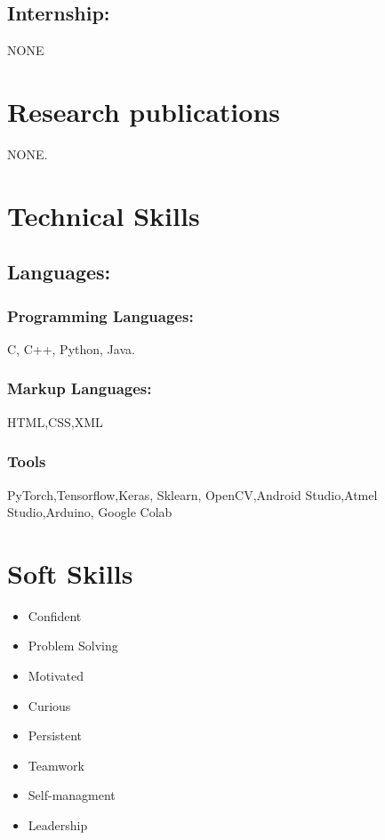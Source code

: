 \documentclass[5pt]{article}
\begin{document}
\subsection{Internship:}
NONE

\section{Research publications}
	NONE.
\section{Technical Skills}
	\subsection{Languages:}
		\subsubsection{Programming Languages: }
			C, C++, Python, Java.
		\subsubsection{Markup Languages:}
			HTML,CSS,XML
		\subsubsection{Tools}
			PyTorch,Tensorflow,Keras, Sklearn, OpenCV,Android Studio,Atmel Studio,Arduino, Google Colab

\section{Soft Skills}
	\begin{multicols}{3}
	\begin{itemize}
	\item Confident \\
 	\item Problem Solving\\
	\item Motivated\\ 
	\columnbreak
	\item Curious\\
	\item Persistent \\
	\item Teamwork\\
	\columnbreak
	\item Self-managment\\
	\item Leadership
	\end{itemize}
	\end{multicols}
\end{document}
